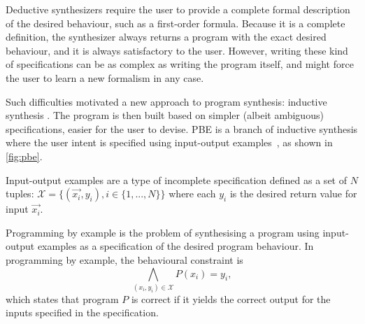 Deductive synthesizers require the user to provide a complete formal description of the desired behaviour, such as a first-order formula.
Because it is a complete definition, the synthesizer always returns a program with the exact desired behaviour, and it is always satisfactory to the user.
However, writing these kind of specifications can be as complex as writing the program itself, and might force the user to learn a new formalism in any case.


Such difficulties motivated a new approach to program synthesis: inductive synthesis \cite{DBLP:conf/pldi/FengMBD18,DBLP:conf/pldi/FengMGDC17,DBLP:conf/ijcai/ShawWG75,DBLP:journals/jacm/Summers77}. The program is then built based on simpler (albeit ambiguous) specifications, easier for the user to devise. \acf{PBE} is a branch of inductive synthesis where the user intent is specified using input-output examples~\cite{DBLP:conf/pldi/GodefroidT12,DBLP:conf/ijcai/ShawWG75,DBLP:journals/jacm/Summers77,DBLP:conf/sigmod/WangCB17,DBLP:conf/pldi/WangCB17}, as shown in \autoref{fig:pbe}.

\begin{definition}
Input-output examples are a type of incomplete specification defined as a set of \(N\) tuples:  \(\mathcal{X} = \{(\vec{x_i}, y_i), i \in \{1, ..., N\}\}\) where each \(y_i\) is the desired return value for input \(\vec{x_i}\).
\end{definition}

\begin{definition}
Programming by example is the problem of synthesising a program using input-output examples as a specification of the desired program behaviour. In programming by example, the behavioural constraint is
\[\bigwedge_{(x_i, y_i) \in \mathcal{X}} P(x_i) = y_i,\]
which states that program \(P\) is correct if it yields the correct output for the inputs specified in the specification.
\end{definition}

\begin{comment}
\begin{example}
Suppose we would like to generate a function which, for any integer input numbers \(x_1\) and \(x_2\) returns their sum:
\[f(x_1, x_2) = x_1 + x_2\]
A \ac{PBE} synthesiser would require some input-output examples as input, for example:
\[\{((1, 1), 2), ((1, 0), 1), ((2, 1), 3), ((2, 0), 2), ((1, 2), 3)\}\]
\end{example}
\end{comment}


